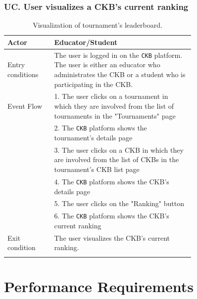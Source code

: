 \subsubsection*{UC\cuc . User visualizes a CKB's current ranking}
\begin{center}
    \begin{longtable}{lp{0.75\linewidth}}
        \hline
        Actor            & Educator/Student \\
        \hline
        Entry conditions & The user is logged in on the \verb|CKB| platform. The user is either an educator who administrates the CKB or a student who is participating in the CKB. \\
        \hline
        Event Flow      
        & 1. The user clicks on a tournament in which they are involved from the list of tournaments in the "Tournaments" page\\
        & 2. The \verb|CKB| platform shows the tournament's details page\\
        & 3. The user clicks on a CKB in which they are involved from the list of CKBs in the tournament's CKB list page\\
        & 4. The \verb|CKB| platform shows the CKB's details page\\
        & 5. The user clicks on the "Ranking" button\\
        & 6. The \verb|CKB| platform shows the CKB's current ranking\\
        \hline
        Exit condition   & The user visualizes the CKB's current ranking.   \\
        \hline
        \caption{Visualization of tournament's leaderboard.}
        \label{tab: ckb_ranking_use_case}
    \end{longtable}

\end{center}


\section{Performance Requirements}
\label{subsec:performance_requirements}%

